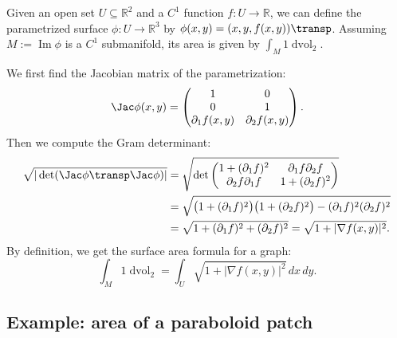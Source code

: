 \begin{example}
\label{ex:integral_graph_function}
Given an open set $U \subseteq \mathbb{R}^2$ and a $C^1$ function $f: U \to \mathbb{R}$, we can define the parametrized surface $\phi: U \to \mathbb{R}^3$ by $\phi(x,y) = (x,y,f(x,y))\transp$.
Assuming $M := \operatorname{Im}\phi$ is a $C^1$ submanifold, its area is given by $\int_M 1 \mathop{d\text{vol}}_2$.

We first find the Jacobian matrix of the parametrization:
\[\Jac\phi(x,y) = \begin{pmatrix} 1 & 0 \\ 0 & 1 \\ \partial_1 f(x,y) & \partial_2 f(x,y) \end{pmatrix}.\]
Then we compute the Gram determinant:
\begin{align*}
\sqrt{|\det(\Jac\phi\transp \Jac\phi)|}
&= \sqrt{\det \begin{pmatrix} 1+(\partial_1 f)^2 & \partial_1 f \partial_2 f \\ \partial_2 f \partial_1 f & 1+(\partial_2 f)^2 \end{pmatrix}} \\
&= \sqrt{\big(1+(\partial_1 f)^2\big)\big(1+(\partial_2 f)^2\big) - (\partial_1 f)^2(\partial_2 f)^2} \\
&= \sqrt{1 + (\partial_1 f)^2 + (\partial_2 f)^2} = \sqrt{1+|\nabla f(x,y)|^2}.
\end{align*}
By definition, we get the surface area formula for a graph:
\[\int_M 1 \mathop{d\text{vol}}_2 = \int_U \sqrt{1+|\nabla f(x,y)|^2} \,dx\,dy.\]
\end{example}

\subsection{Example: area of a paraboloid patch}
\label{sec:example_paraboloid_area}

